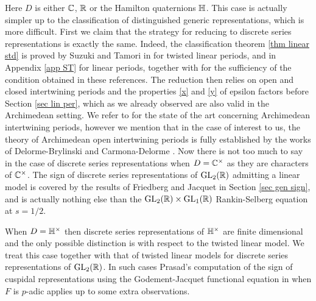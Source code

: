\documentclass[11pt,letterpaper]{amsart}
\newcommand{\GL}{{\mathrm {GL}}} \newcommand{\PGL}{{\mathrm {PGL}}}
\theoremstyle{plain}
\numberwithin{equation}{section}
\begin{document}
Here $D$ is either ${\mathbb {C}}$, ${\mathbb {R}}$ or the Hamilton quaternions ${\mathbb {H}}$. This case is actually simpler up to the classification of distinguished generic representations, which is more difficult. First we claim that the strategy for reducing to discrete series representations is exactly the same. Indeed, the classification theorem \ref{thm linear std} is proved by Suzuki and Tamori in \cite{ST} for twisted linear periods, and in Appendix \ref{app ST} for linear periods, together with \cite[Theorem 5.4]{MOY} for the sufficiency of the condition obtained in these references. The reduction then relies on open and closed intertwining periods and the properties \eqref{x} and \eqref{y} of epsilon factors before Section \ref{sec lin per}, which as we already observed are also valid in the Archimedean setting. We refer to \cite{MOY} for the state of the art concerning Archimedean intertwining periods, however we mention that in the case of interest to us, the theory of Archimedean open intertwining periods is fully established by the works of Delorme-Brylinski \cite{Brylinski-Delorme-H-inv-form-MeroExtension-Invention} and Carmona-Delorme \cite{Carmona-Delorme-H-inv-form-FE-JFA}. Now there is not too much to say in the case of discrete series representations when $D={\mathbb {C}}^\times$ as they are characters of ${\mathbb {C}}^\times$. The sign of discrete series representations of $\GL_2(\BR)$ admitting a linear model is covered by the results of Friedberg and Jacquet in Section \ref{sec gen sign}, and is actually nothing else than the $\GL_2(\BR)\times \GL_1(\BR)$ Rankin-Selberg equation at $s=1/2$.


When $D={\mathbb {H}}^\times$ then discrete series representations of ${\mathbb {H}}^\times$ are finite dimensional and the only possible distinction is with respect to the twisted linear model. We treat this case together with that of twisted linear models for 
discrete series representations of $\GL_2(\BR)$. In such cases Prasad's computation of the sign of cuspidal representations using the Godement-Jacquet functional equation in \cite[Theorem 4]{P} when $F$ is $p$-adic applies up to some extra observations. 
\end{document}
